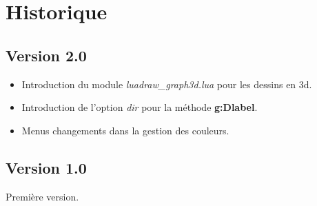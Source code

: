 \section{Historique}

\subsection{Version 2.0}

\begin{itemize}
    \item Introduction du module \emph{luadraw\_graph3d.lua} pour les dessins en 3d.
    \item Introduction de l'option \emph{dir} pour la méthode \textbf{g:Dlabel}.
    \item Menus changements dans la gestion des couleurs.
\end{itemize}

\subsection{Version 1.0}
Première version.
